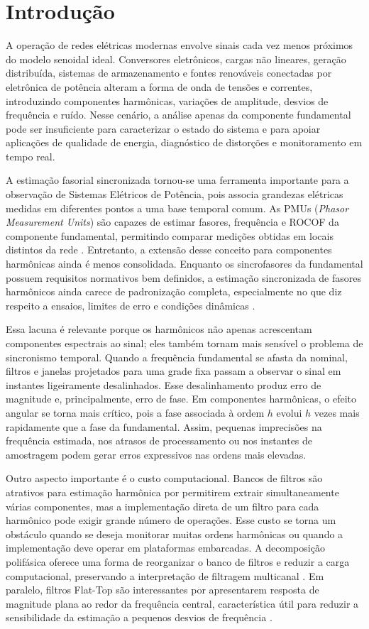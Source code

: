\chapter{Introdução}\label{cap:intro}

A operação de redes elétricas modernas envolve sinais cada vez menos próximos do modelo senoidal ideal. Conversores eletrônicos, cargas não lineares, geração distribuída, sistemas de armazenamento e fontes renováveis conectadas por eletrônica de potência alteram a forma de onda de tensões e correntes, introduzindo componentes harmônicas, variações de amplitude, desvios de frequência e ruído. Nesse cenário, a análise apenas da componente fundamental pode ser insuficiente para caracterizar o estado do sistema e para apoiar aplicações de qualidade de energia, diagnóstico de distorções e monitoramento em tempo real.

A estimação fasorial sincronizada tornou-se uma ferramenta importante para a observação de Sistemas Elétricos de Potência, pois associa grandezas elétricas medidas em diferentes pontos a uma base temporal comum. As PMUs (\textit{Phasor Measurement Units}) são capazes de estimar fasores, frequência e ROCOF da componente fundamental, permitindo comparar medições obtidas em locais distintos da rede \cite{phadke2008,ieee2011}. Entretanto, a extensão desse conceito para componentes harmônicas ainda é menos consolidada. Enquanto os sincrofasores da fundamental possuem requisitos normativos bem definidos, a estimação sincronizada de fasores harmônicos ainda carece de padronização completa, especialmente no que diz respeito a ensaios, limites de erro e condições dinâmicas \cite{iec60255}.

Essa lacuna é relevante porque os harmônicos não apenas acrescentam componentes espectrais ao sinal; eles também tornam mais sensível o problema de sincronismo temporal. Quando a frequência fundamental se afasta da nominal, filtros e janelas projetados para uma grade fixa passam a observar o sinal em instantes ligeiramente desalinhados. Esse desalinhamento produz erro de magnitude e, principalmente, erro de fase. Em componentes harmônicas, o efeito angular se torna mais crítico, pois a fase associada à ordem $h$ evolui $h$ vezes mais rapidamente que a fase da fundamental. Assim, pequenas imprecisões na frequência estimada, nos atrasos de processamento ou nos instantes de amostragem podem gerar erros expressivos nas ordens mais elevadas.

Outro aspecto importante é o custo computacional. Bancos de filtros são atrativos para estimação harmônica por permitirem extrair simultaneamente várias componentes, mas a implementação direta de um filtro para cada harmônico pode exigir grande número de operações. Esse custo se torna um obstáculo quando se deseja monitorar muitas ordens harmônicas ou quando a implementação deve operar em plataformas embarcadas. A decomposição polifásica oferece uma forma de reorganizar o banco de filtros e reduzir a carga computacional, preservando a interpretação de filtragem multicanal \cite{mk06}. Em paralelo, filtros Flat-Top são interessantes por apresentarem resposta de magnitude plana ao redor da frequência central, característica útil para reduzir a sensibilidade da estimação a pequenos desvios de frequência \cite{duda2019}.

